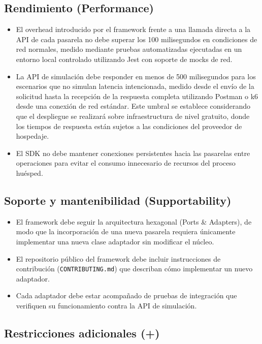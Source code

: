 \documentclass[10pt]{article}
\begin{document}
\subsection{Rendimiento (Performance)}

\begin{itemize}
  \item El overhead introducido por el framework frente a una llamada directa a la API de cada pasarela no debe superar los 100 milisegundos en condiciones de red normales, medido mediante pruebas automatizadas ejecutadas en un entorno local controlado utilizando Jest con soporte de mocks de red.
  \item La API de simulación debe responder en menos de 500 milisegundos para los escenarios que no simulan latencia intencionada, medido desde el envío de la solicitud hasta la recepción de la respuesta completa utilizando Postman o k6 desde una conexión de red estándar. Este umbral se establece considerando que el despliegue se realizará sobre infraestructura de nivel gratuito, donde los tiempos de respuesta están sujetos a las condiciones del proveedor de hospedaje.
  \item El SDK no debe mantener conexiones persistentes hacia las pasarelas entre operaciones para evitar el consumo innecesario de recursos del proceso huésped.
\end{itemize}

\subsection{Soporte y mantenibilidad (Supportability)}

\begin{itemize}
  \item El framework debe seguir la arquitectura hexagonal (Ports \& Adapters), de modo que la incorporación de una nueva pasarela requiera únicamente implementar una nueva clase adaptador sin modificar el núcleo.
  \item El repositorio público del framework debe incluir instrucciones de contribución (\texttt{CONTRIBUTING.md}) que describan cómo implementar un nuevo adaptador.
  \item Cada adaptador debe estar acompañado de pruebas de integración que verifiquen su funcionamiento contra la API de simulación.
\end{itemize}

\subsection{Restricciones adicionales (+)}
\end{document}
